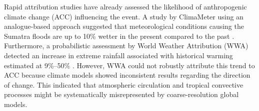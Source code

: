 Rapid attribution studies have already assessed the likelihood of anthropogenic climate change (ACC) influencing the event. A study by ClimaMeter using an analogue-based approach suggested that meteorological conditions causing the Sumatra floods are up to 10\% wetter in the present compared to the past \citep{climameter}. Furthermore, a probabilistic assessment by World Weather Attribution (WWA) detected an increase in extreme rainfall associated with historical warming estimated at 9\%–50\% \citep{wwa}. However, WWA could not robustly attribute this trend to ACC because climate models showed inconsistent results regarding the direction of change. This indicated that atmospheric circulation and tropical convective processes might be systematically misrepresented by coarse-resolution global models.

